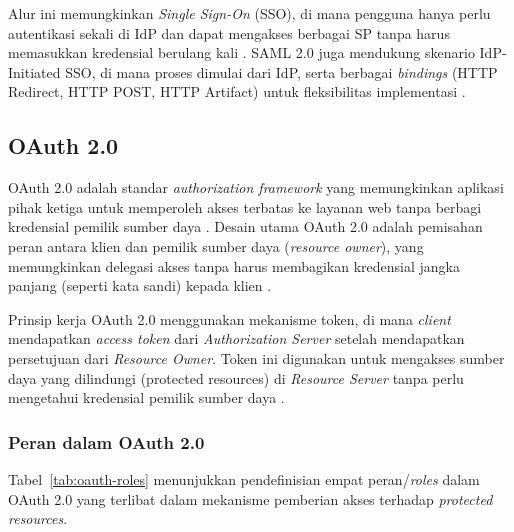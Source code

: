 Alur ini memungkinkan \textit{Single Sign-On} (SSO), di mana pengguna hanya perlu autentikasi sekali di IdP dan dapat mengakses berbagai SP tanpa harus memasukkan kredensial berulang kali \autocite{CONRAD2023295}.
SAML 2.0 juga mendukung skenario IdP-Initiated SSO, di mana proses dimulai dari IdP, serta berbagai \textit{bindings} (HTTP Redirect, HTTP POST, HTTP Artifact) untuk fleksibilitas implementasi \autocite{samlspec}.

\subsection{OAuth 2.0}

OAuth 2.0 adalah standar \textit{authorization framework} yang memungkinkan aplikasi pihak ketiga untuk memperoleh akses terbatas ke layanan web tanpa berbagi kredensial pemilik sumber daya \autocite{jaimeauthorizationmodels}.
Desain utama OAuth 2.0 adalah pemisahan peran antara klien dan pemilik sumber daya (\textit{resource owner}), yang memungkinkan delegasi akses tanpa harus membagikan kredensial jangka panjang (seperti kata sandi) kepada klien \autocite{oauthspec}.

Prinsip kerja OAuth 2.0 menggunakan mekanisme token, di mana \textit{client} mendapatkan \textit{access token} dari \textit{Authorization Server} setelah mendapatkan persetujuan dari \textit{Resource Owner}.
Token ini digunakan untuk mengakses sumber daya yang dilindungi (protected resources) di \textit{Resource Server} tanpa perlu mengetahui kredensial pemilik sumber daya \autocite{oauthspec}.

\subsubsection{Peran dalam OAuth 2.0}\label{subsubsec:peran-oauth}

Tabel~\ref{tab:oauth-roles} menunjukkan pendefinisian empat peran/\textit{roles} dalam OAuth 2.0 yang terlibat dalam mekanisme pemberian akses terhadap \textit{protected resources}.


